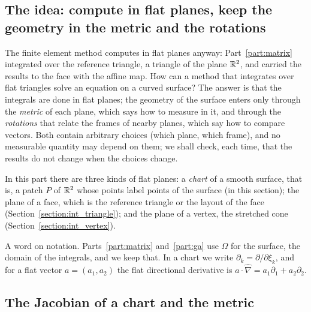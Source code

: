 \subsection{The idea: compute in flat planes, keep the geometry in the metric and the rotations}
\label{section:r3_idea}

The finite element method computes in flat planes anyway: Part~\ref{part:matrix} integrated over the reference triangle, a triangle of the plane $\mathbb{R}^2$, and carried the results to the face with the affine map. How can a method that integrates over flat triangles solve an equation on a curved surface? The answer is that the integrals are done in flat planes; the geometry of the surface enters only through the \emph{metric} of each plane, which says how to measure in it, and through the \emph{rotations} that relate the frames of nearby planes, which say how to compare vectors. Both contain arbitrary choices (which plane, which frame), and no measurable quantity may depend on them; we shall check, each time, that the results do not change when the choices change.

In this part there are three kinds of flat planes: a \emph{chart} of a smooth surface, that is, a patch $P$ of $\mathbb{R}^2$ whose points label points of the surface (in this section); the plane of a face, which is the reference triangle or the layout of the face (Section~\ref{section:int_triangle}); and the plane of a vertex, the stretched cone (Section~\ref{section:int_vertex}).

A word on notation. Parts~\ref{part:matrix} and~\ref{part:ga} use $\Omega$ for the surface, the domain of the integrals, and we keep that. In a chart we write $\partial_k = \partial/\partial\xi_k$, and for a flat vector $a = (a_1, a_2)$ the flat directional derivative is $a\cdot\hat\nabla = a_1\partial_1 + a_2\partial_2$.

\subsection{The Jacobian of a chart and the metric}
\label{section:r3_displacement}


